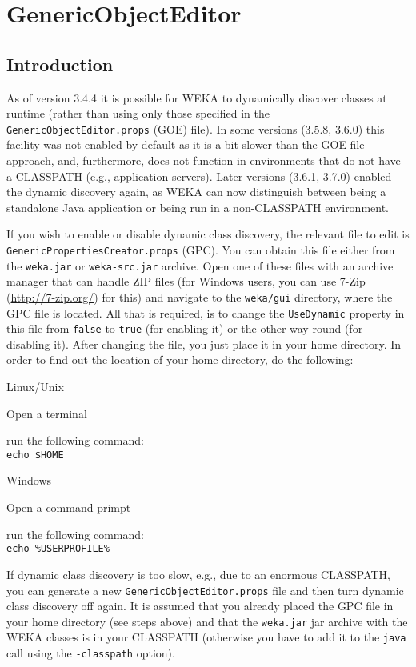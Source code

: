 \newpage

\section{GenericObjectEditor}
\label{genericobjecteditor}
\subsection{Introduction}
As of version 3.4.4 it is possible for WEKA to dynamically discover
classes at runtime (rather than using only those specified in the
\verb=GenericObjectEditor.props= (GOE) file). In some versions 
(3.5.8, 3.6.0) this facility was not enabled by default as it is a bit slower
than the GOE file approach, and, furthermore, does not function in
environments that do not have a CLASSPATH (e.g., application servers). Later
versions (3.6.1, 3.7.0) enabled the dynamic discovery again, as WEKA can
now distinguish between being a standalone Java application or being run in a
non-CLASSPATH environment.

If you wish to enable or disable dynamic class discovery, the relevant file to
edit is \verb=GenericPropertiesCreator.props= (GPC). You can obtain this file
either from the \texttt{weka.jar} or \texttt{weka-src.jar} archive. Open one of
these files with an archive manager that can handle ZIP files (for Windows
users, you can use 7-Zip (\url{http://7-zip.org/}{}) for this) and
navigate to the \texttt{weka/gui} directory, where the GPC file is located. All
that is required, is to change the \verb=UseDynamic= property in this file from
\verb=false= to \verb=true= (for enabling it) or the other way round (for
disabling it). After changing the file, you just place it in your home
directory. In order to find out the location of your home directory,
do the following:
\begin{tight_itemize}
	\item Linux/Unix
		\begin{tight_itemize}
 			\item Open a terminal
			\item run the following command: \\
			\texttt{echo \$HOME}
		\end{tight_itemize}
	\item Windows
		\begin{tight_itemize}
 			\item Open a command-primpt
			\item run the following command: \\
			\texttt{echo \%USERPROFILE\%}
		\end{tight_itemize}
\end{tight_itemize}
If dynamic class discovery is too slow, e.g., due to an enormous CLASSPATH, you
can generate a new \verb=GenericObjectEditor.props= file and then turn dynamic
class discovery off again. It is assumed that you already placed the GPC file in
your home directory (see steps above) and that the \texttt{weka.jar} jar
archive with the WEKA classes is in your CLASSPATH (otherwise you have to add it
to the \texttt{java} call using the \texttt{-classpath} option). \\

